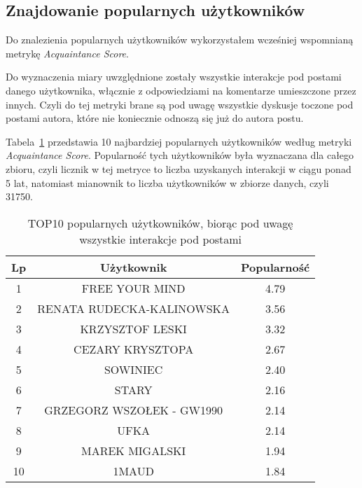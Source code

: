 \documentclass[polish,12pt]{aghthesis}
\begin{document}
\subsection{Znajdowanie popularnych użytkowników}
Do znalezienia popularnych użytkowników wykorzystałem wcześniej wspomnianą metrykę \textit{Acquaintance Score}.

Do wyznaczenia miary uwzględnione zostały wszystkie interakcje pod postami danego użytkownika, włącznie z odpowiedziami na komentarze umieszczone przez innych. Czyli do tej metryki brane są pod uwagę wszystkie dyskusje toczone pod postami autora, które nie koniecznie odnoszą się już do autora postu.

 Tabela~\ref{tab1} przedstawia 10 najbardziej popularnych użytkowników według metryki \textit{Acquaintance Score}.
Popularność tych użytkowników była wyznaczana dla całego zbioru, czyli licznik w tej metryce to liczba uzyskanych interakcji w ciągu ponad 5 lat, natomiast mianownik to liczba użytkowników w zbiorze danych, czyli 31750. 



   
 \begin{table}

    \begin{center}
    

\begin{tabular}{ |c|c|c| } 
\hline
 \textbf{Lp} & \textbf{Użytkownik} & \textbf{Popularność} \\ [0.5ex] 
 \hline
 \hline
1 & FREE YOUR MIND & 4.79 \\
2 & RENATA RUDECKA-KALINOWSKA & 3.56 \\
3 & KRZYSZTOF LESKI & 3.32 \\
4 & CEZARY KRYSZTOPA & 2.67 \\
5 & SOWINIEC & 2.40 \\
6 & STARY & 2.16 \\
7 & GRZEGORZ WSZOŁEK - GW1990 & 2.14 \\
8 & UFKA & 2.14 \\
9 & MAREK MIGALSKI & 1.94 \\
10 & 1MAUD & 1.84 \\
 \hline
\end{tabular}
\end{center}
\caption[Popularni użytkownicy - wszystkie interakcje]{TOP10 popularnych użytkowników, biorąc pod uwagę wszystkie interakcje pod postami}
\label{tab1}
\end{table}

\FloatBarrier
\end{document}
